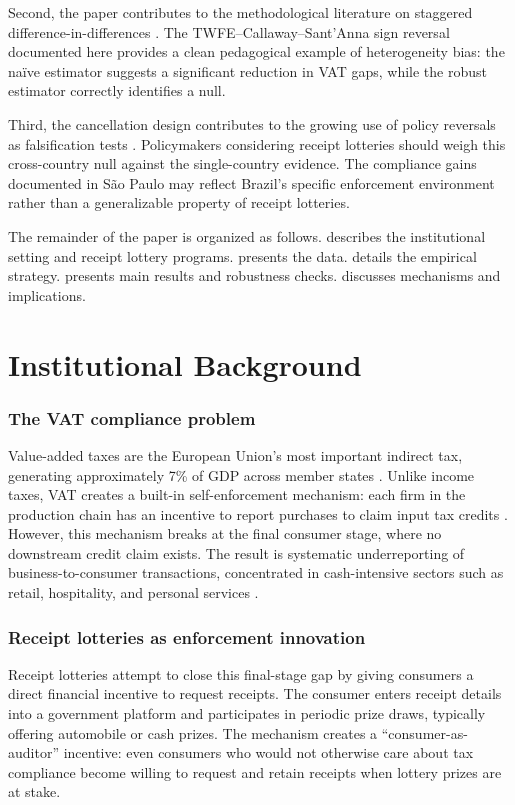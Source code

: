 \documentclass[12pt]{article}
\begin{document}
Second, the paper contributes to the methodological literature on staggered difference-in-differences \citep{callaway2021, sun2021, dechaisemartin2020, roth2023}. The TWFE--Callaway--Sant'Anna sign reversal documented here provides a clean pedagogical example of heterogeneity bias: the na\"ive estimator suggests a significant reduction in VAT gaps, while the robust estimator correctly identifies a null.

Third, the cancellation design contributes to the growing use of policy reversals as falsification tests \citep{autor2022}. Policymakers considering receipt lotteries should weigh this cross-country null against the single-country evidence. The compliance gains documented in S\~{a}o Paulo may reflect Brazil's specific enforcement environment rather than a generalizable property of receipt lotteries.

The remainder of the paper is organized as follows.  describes the institutional setting and receipt lottery programs.  presents the data.  details the empirical strategy.  presents main results and robustness checks.  discusses mechanisms and implications.

\section{Institutional Background}
\label{sec:background}

\subsubsection*{The VAT compliance problem} Value-added taxes are the European Union's most important indirect tax, generating approximately 7\% of GDP across member states \citep{keen2006}. Unlike income taxes, VAT creates a built-in self-enforcement mechanism: each firm in the production chain has an incentive to report purchases to claim input tax credits \citep{pomeranz2015}. However, this mechanism breaks at the final consumer stage, where no downstream credit claim exists. The result is systematic underreporting of business-to-consumer transactions, concentrated in cash-intensive sectors such as retail, hospitality, and personal services \citep{slemrod2019}.

\subsubsection*{Receipt lotteries as enforcement innovation} Receipt lotteries attempt to close this final-stage gap by giving consumers a direct financial incentive to request receipts. The consumer enters receipt details into a government platform and participates in periodic prize draws, typically offering automobile or cash prizes. The mechanism creates a \citet{gordon1990} ``consumer-as-auditor'' incentive: even consumers who would not otherwise care about tax compliance become willing to request and retain receipts when lottery prizes are at stake.
\end{document}

